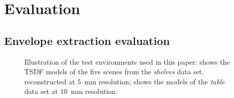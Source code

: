 \section{Evaluation}
\label{sec:results}
\subsection{Envelope extraction evaluation}
\label{sec:offline_tests}
%
\begin{figure}[t!]
\centering
{}
\caption{Illustration of the test environments used in this paper:  shows the TSDF models of the five scenes from the \textit{shelves} data set, reconstructed at $5$~mm resolution;  shows the models of the \textit{table} data set at $10$~mm resolution.}
\label{fig:environments}
\end{figure}
%
